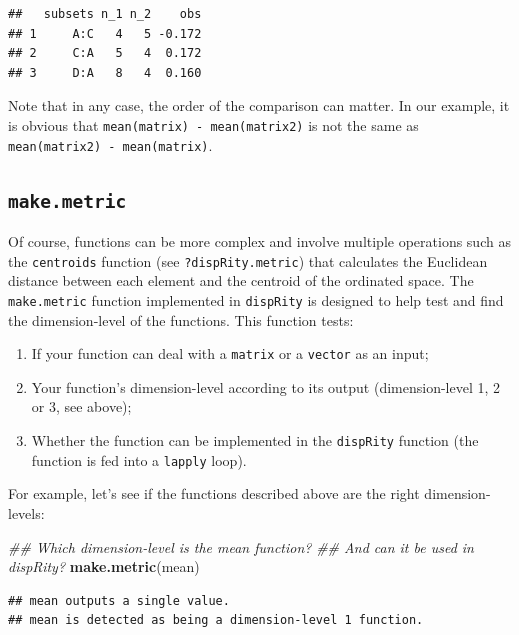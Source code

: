 \documentclass[]{book}
\newenvironment{Shaded}{\begin{snugshade}}{\end{snugshade}}
\newcommand{\CommentTok}[1]{\textcolor[rgb]{0.56,0.35,0.01}{\textit{#1}}}
\newcommand{\KeywordTok}[1]{\textcolor[rgb]{0.13,0.29,0.53}{\textbf{#1}}}
\newcommand{\NormalTok}[1]{#1}
\providecommand{\tightlist}{%
  \setlength{\itemsep}{0pt}\setlength{\parskip}{0pt}}
\begin{document}
\begin{verbatim}
##   subsets n_1 n_2    obs
## 1     A:C   4   5 -0.172
## 2     C:A   5   4  0.172
## 3     D:A   8   4  0.160
\end{verbatim}

Note that in any case, the order of the comparison can matter.
In our example, it is obvious that \texttt{mean(matrix)\ -\ mean(matrix2)} is not the same as \texttt{mean(matrix2)\ -\ mean(matrix)}.

\hypertarget{makemetric}{%
\subsection{\texorpdfstring{\texttt{make.metric}}{make.metric}}\label{makemetric}}

Of course, functions can be more complex and involve multiple operations such as the \texttt{centroids} function (see \texttt{?dispRity.metric}) that calculates the Euclidean distance between each element and the centroid of the ordinated space.
The \texttt{make.metric} function implemented in \texttt{dispRity} is designed to help test and find the dimension-level of the functions.
This function tests:

\begin{enumerate}
\def\labelenumi{\arabic{enumi}.}
\tightlist
\item
  If your function can deal with a \texttt{matrix} or a \texttt{vector} as an input;
\item
  Your function's dimension-level according to its output (dimension-level 1, 2 or 3, see above);
\item
  Whether the function can be implemented in the \texttt{dispRity} function (the function is fed into a \texttt{lapply} loop).
\end{enumerate}

For example, let's see if the functions described above are the right dimension-levels:

\begin{Shaded}
\begin{Highlighting}[]
\CommentTok{## Which dimension-level is the mean function?}
\CommentTok{## And can it be used in dispRity?}
\KeywordTok{make.metric}\NormalTok{(mean)}
\end{Highlighting}
\end{Shaded}

\begin{verbatim}
## mean outputs a single value.
## mean is detected as being a dimension-level 1 function.
\end{verbatim}
\end{document}
